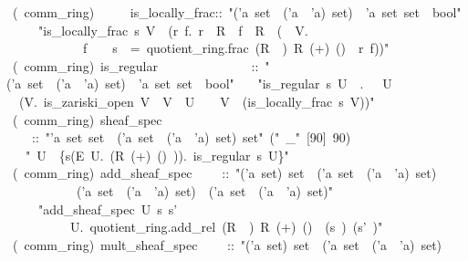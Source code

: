 \documentclass[12pt]{scrartcl}
\begin{document}
\begin{isabelle}
\ (\ comm\_ring)\ \isanewline
\ \ \ \ is\_locally\_frac::\ "('a\ set\ \isasymRightarrow \ ('a\ \isasymtimes \ 'a)\ set)\ \isasymRightarrow \ 'a\ set\ set\ \isasymRightarrow \ bool"\isanewline
\ \ \ \ \ "is\_locally\_frac\ s\ V\ \isasymequiv \ (\isasymexists r\ f.\ r\ \isasymin \ R\ \isasymand \ f\ \isasymin \ R\ \isasymand \ (\isasymforall \isasymqq \ \isasymin \ V.\ \isanewline
\ \ \ \ \ \ \ \ \ \ \ \ f\ \isasymnotin \ \isasymqq \ \isasymand \ s\ \isasymqq \ =\ quotient\_ring.frac\ (R\ \isasymsetminus \ \isasymqq )\ R\ (+)\ (\isasymcdot )\ \isasymzero \ r\ f))"\isanewline
\isanewline
{}\ (\ comm\_ring)\ is\_regular\isanewline
\ \ \ \ \ \ \ \ \ \ \ \ \ \ ::\ "('a\ set\ \isasymRightarrow \ ('a\ \isasymtimes \ 'a)\ set)\ \isasymRightarrow \ 'a\ set\ set\ \isasymRightarrow \ bool"\isanewline
\ \ \ "is\_regular\ s\ U\ \isasymequiv \ \isasymforall \isasympp .\ \isasympp \ \isasymin \ U\ \isasymlongrightarrow \ \isanewline
\ \ (\isasymexists V.\ is\_zariski\_open\ V\ \isasymand \ V\ \isasymsubseteq \ U\ \isasymand \ \isasympp \ \isasymin \ V\ \isasymand \ (is\_locally\_frac\ s\ V))"\isanewline
\isanewline
{}\ (\ comm\_ring)\ sheaf\_spec\isanewline
\ \ \ \ ::\ "'a\ set\ set\ \isasymRightarrow \ ('a\ set\ \isasymRightarrow \ ('a\ \isasymtimes \ 'a)\ set)\ set"\ ("\isasymO \ \_"\ [90]\ 90)\isanewline
\ \ \ "\isasymO \ U\ \isasymequiv \ \{s\isasymin (\isasymPi \isactrlsub E\ \isasympp \isasymin U.\ (R\isactrlbsub \isasympp \ (+)\ (\isasymcdot )\ \isasymzero \isactrlesub )).\ is\_regular\ s\ U\}"\isanewline
\isanewline
{}\ (\ comm\_ring)\ add\_sheaf\_spec\isanewline
\ \ \ \ ::\ "('a\ set)\ set\ \isasymRightarrow \ ('a\ set\ \isasymRightarrow \ ('a\ \isasymtimes \ 'a)\ set)\ \isanewline
\ \ \ \ \ \ \ \ \ \ \isasymRightarrow \ ('a\ set\ \isasymRightarrow \ ('a\ \isasymtimes \ 'a)\ set)\ \isasymRightarrow \ ('a\ set\ \isasymRightarrow \ ('a\ \isasymtimes \ 'a)\ set)"\isanewline
\ \ \ \ \ "add\_sheaf\_spec\ U\ s\ s'\ \isasymequiv \ \isanewline
\ \ \ \ \ \ \ \ \ \ \isasymlambda \isasympp \isasymin U.\ quotient\_ring.add\_rel\ (R\ \isasymsetminus \ \isasympp )\ R\ (+)\ (\isasymcdot )\ \isasymzero \ (s\ \isasympp )\ (s'\ \isasympp )"\isanewline
\isanewline
{}\ (\ comm\_ring)\ mult\_sheaf\_spec\isanewline
\ \ \ \ ::\ "('a\ set)\ set\ \isasymRightarrow \ ('a\ set\ \isasymRightarrow \ ('a\ \isasymtimes \ 'a)\ set)\ \isanewline

\end{isabelle}
\end{document}
